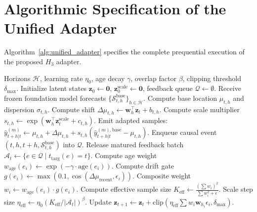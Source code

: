 \documentclass[10pt,journal,compsoc]{IEEEtran}
\begin{document}
\section{Algorithmic Specification of the Unified Adapter}
Algorithm~\ref{alg:unified_adapter} specifies the complete prequential execution of the proposed $H_3$ adapter.

\begin{algorithm}[h!]
\caption{Unified Overlap-Aware Online Adapter ($H_3$)}
\label{alg:unified_adapter}
\begin{algorithmic}[1]
\Require Horizons $\mathcal{H}$, learning rate $\eta_0$, age decay $\gamma$, overlap factor $\beta$, clipping threshold $\delta_{\max}$.
\State Initialize latent states $\mathbf{z}_0 \leftarrow \mathbf{0}$, $\mathbf{z}_0^{\text{scale}} \leftarrow \mathbf{0}$, feedback queue $\mathcal{Q} \leftarrow \emptyset$.
    \State Receive frozen foundation model forecasts $\{\mathcal{S}_{t,h}^{\text{base}}\}_{h \in \mathcal{H}}$.
        \State Compute base location $\mu_{t,h}$ and dispersion $\sigma_{t,h}$.
        \State Compute shift $\Delta \mu_{t,h} \leftarrow \mathbf{w}_h^\top \mathbf{z}_t + b_{t,h}$.
        \State Compute scale multiplier $s_{t,h} \leftarrow \exp(\mathbf{w}_h^\top \mathbf{z}_t^{\text{scale}} + c_{t,h})$.
        \State Emit adapted samples: $\hat{y}_{t+h|t}^{(m)} \leftarrow \mu_{t,h} + \Delta \mu_{t,h} + s_{t,h}(\hat{y}_{t+h|t}^{(m), \text{base}} - \mu_{t,h})$.
        \State Enqueue causal event $(t, h, t+h, \mathcal{S}_{t,h}^{\text{base}})$ into $\mathcal{Q}$.
    \EndFor
    \State Release matured feedback batch $\mathcal{A}_t \leftarrow \{e \in \mathcal{Q} \mid t_{\text{targ}}(e) = t\}$.
            \State Compute age weight $w_{\text{age}}(e_i) \leftarrow \exp(-\gamma \cdot \text{age}(e_i))$.
            \State Compute drift gate $g(e_i) \leftarrow \max(0.1, \cos(\Delta \mu_{\text{recent}}, \epsilon_i))$.
            \State Composite weight $w_i \leftarrow w_{\text{age}}(e_i) \cdot g(e_i)$.
        \EndFor
        \State Compute effective sample size $K_{\text{eff}} \leftarrow \frac{(\sum w_i)^2}{\sum w_i^2 + \epsilon}$.
        \State Scale step size $\eta_{\text{eff}} \leftarrow \eta_0 (K_{\text{eff}} / |\mathcal{A}_t|)^\beta$.
        \State Update $\mathbf{z}_{t+1} \leftarrow \mathbf{z}_t + \text{clip}\left(\eta_{\text{eff}} \sum w_i \mathbf{w}_{h_i} \epsilon_i, \delta_{\max}\right)$.
    \EndIf
\EndFor
\end{algorithmic}
\end{algorithm}
\end{document}
